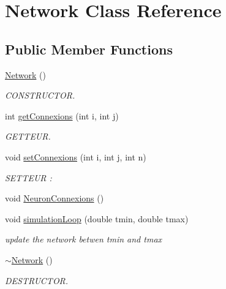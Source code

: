 \hypertarget{classNetwork}{\section{Network Class Reference}
\label{classNetwork}
}
\subsection*{Public Member Functions}
\begin{DoxyCompactItemize}
\item 
\hyperlink{classNetwork_a3cc2fb4f8fa4d507077e8da85ce5a1c8}{Network} ()
\begin{DoxyCompactList}\small\item\em C\-O\-N\-S\-T\-R\-U\-C\-T\-O\-R. \end{DoxyCompactList}\item 
int \hyperlink{classNetwork_ac6ad672f621df7948183b994a5a4d6f9}{get\-Connexions} (int i, int j)
\begin{DoxyCompactList}\small\item\em G\-E\-T\-T\-E\-U\-R. \end{DoxyCompactList}\item 
void \hyperlink{classNetwork_a07559592f9709c9ecdc4a2d0134965ec}{set\-Connexions} (int i, int j, int n)
\begin{DoxyCompactList}\small\item\em S\-E\-T\-T\-E\-U\-R \-: \end{DoxyCompactList}\item 
void \hyperlink{classNetwork_aa04fb62a678f2b9729010c5fcbd16b56}{Neuron\-Connexions} ()
\item 
void \hyperlink{classNetwork_a6564e403499533e4f6c254400043fba2}{simulation\-Loop} (double tmin, double tmax)
\begin{DoxyCompactList}\small\item\em update the network betwen tmin and tmax \end{DoxyCompactList}\item 
\hypertarget{classNetwork_a7a4e19cdb4bf0c7ecf82baa643831492}{\hyperlink{classNetwork_a7a4e19cdb4bf0c7ecf82baa643831492}{$\sim$\-Network} ()}\label{classNetwork_a7a4e19cdb4bf0c7ecf82baa643831492}

\begin{DoxyCompactList}\small\item\em D\-E\-S\-T\-R\-U\-C\-T\-O\-R. \end{DoxyCompactList}\end{DoxyCompactItemize}


